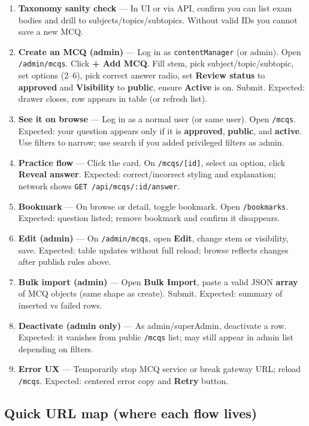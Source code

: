\documentclass[11pt,a4paper]{article}
\begin{document}
\begin{enumerate}[leftmargin=*]
  \item \textbf{Taxonomy sanity check} --- In UI or via API, confirm you can list exam bodies and drill to subjects/topics/subtopics. Without valid IDs you cannot save a new MCQ.
  \item \textbf{Create an MCQ (admin)} --- Log in as \texttt{contentManager} (or admin). Open \texttt{/admin/mcqs}. Click \textbf{+ Add MCQ}. Fill stem, pick subject/topic/subtopic, set options (2--6), pick correct answer radio, set \textbf{Review status} to \textbf{approved} and \textbf{Visibility} to \textbf{public}, ensure \textbf{Active} is on. Submit. Expected: drawer closes, row appears in table (or refresh list).
  \item \textbf{See it on browse} --- Log in as a normal user (or same user). Open \texttt{/mcqs}. Expected: your question appears only if it is \textbf{approved}, \textbf{public}, and \textbf{active}. Use filters to narrow; use search if you added privileged filters as admin.
  \item \textbf{Practice flow} --- Click the card. On \texttt{/mcqs/[id]}, select an option, click \textbf{Reveal answer}. Expected: correct/incorrect styling and explanation; network shows \texttt{GET /api/mcqs/:id/answer}.
  \item \textbf{Bookmark} --- On browse or detail, toggle bookmark. Open \texttt{/bookmarks}. Expected: question listed; remove bookmark and confirm it disappears.
  \item \textbf{Edit (admin)} --- On \texttt{/admin/mcqs}, open \textbf{Edit}, change stem or visibility, save. Expected: table updates without full reload; browse reflects changes after publish rules above.
  \item \textbf{Bulk import (admin)} --- Open \textbf{Bulk Import}, paste a valid JSON \textbf{array} of MCQ objects (same shape as create). Submit. Expected: summary of inserted vs failed rows.
  \item \textbf{Deactivate (admin only)} --- As admin/superAdmin, deactivate a row. Expected: it vanishes from public \texttt{/mcqs} list; may still appear in admin list depending on filters.
  \item \textbf{Error UX} --- Temporarily stop MCQ service or break gateway URL; reload \texttt{/mcqs}. Expected: centered error copy and \textbf{Retry} button.
\end{enumerate}

\subsection{Quick URL map (where each flow lives)}
\end{document}
